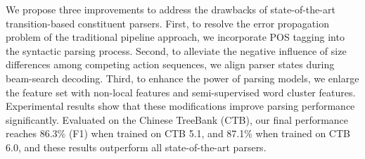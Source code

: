 We propose three improvements to address the drawbacks of state-of-the-art transition-based constituent parsers. First, to resolve the error propagation problem of the traditional pipeline approach, we incorporate POS tagging into the syntactic parsing process. Second, to alleviate the negative influence of size differences among competing action sequences, we align parser states during beam-search decoding. Third, to enhance the power of parsing models, we enlarge the feature set with non-local features and semi-supervised word cluster features. Experimental results show that these modifications improve parsing performance significantly. Evaluated on the Chinese TreeBank (CTB), our final performance reaches 86.3\% (F1) when trained on CTB 5.1, and 87.1\% when trained on CTB 6.0, and these results outperform all state-of-the-art parsers.

